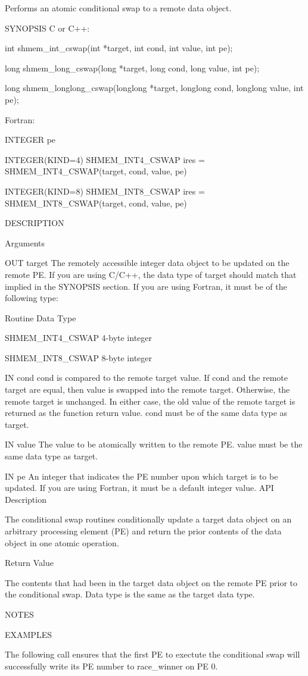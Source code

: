        Performs an atomic conditional swap to a	remote
       data object.

SYNOPSIS
       C or C++:

	  int shmem_int_cswap(int *target, int cond, int value, int pe);

	  long shmem_long_cswap(long *target, long cond, long value, int pe);

	  long	shmem_longlong_cswap(longlong *target, longlong cond, longlong
	  value, int pe);

       Fortran:

	  INTEGER pe

	  INTEGER(KIND=4) SHMEM_INT4_CSWAP
	  ires = SHMEM_INT4_CSWAP(target, cond, value, pe)

	  INTEGER(KIND=8) SHMEM_INT8_CSWAP
	  ires = SHMEM_INT8_CSWAP(target, cond, value, pe)

DESCRIPTION

Arguments


       OUT	target	 The  remotely accessible integer data object to be updated on
		 the remote PE.	 If you are using  C/C++,  the	data  type  of
		 target should match that implied in the SYNOPSIS section.  If
		 you are using Fortran, it must be of the following type:

		 Routine	       Data Type

		 SHMEM_INT4_CSWAP      4-byte integer

		 SHMEM_INT8_CSWAP      8-byte integer

       IN	cond	 cond is compared to the remote target value.  If cond and the
		 remote	 target	 are  equal,  then  value  is swapped into the
		 remote target.	 Otherwise, the remote	target	is  unchanged.
		 In  either  case,  the	 old  value  of	 the  remote target is
		 returned as the function return value.	 cond must be  of  the
		 same data type as target.

       IN	value	 The  value  to be atomically written to the remote PE.	 value
		 must be the same data type as target.

       IN	pe	 An integer that indicates the PE number upon which target  is
		 to  be	 updated.   If	you  are  using	 Fortran, it must be a
		 default integer value.
API Description

       The conditional swap routines conditionally update a target data object
       on  an  arbitrary processing element (PE) and return the prior contents
       of the data object in one  atomic  operation.   

Return Value

       The contents that had been in the target data object on the  remote  PE
       prior to the conditional swap. Data type is the same as the target data type.

	
NOTES


EXAMPLES

       The   following	call  ensures  that  the  first	 PE  to	 exectute  the
       conditional swap will successfully write its PE number  to  race_winner
       on PE 0.
	
	
